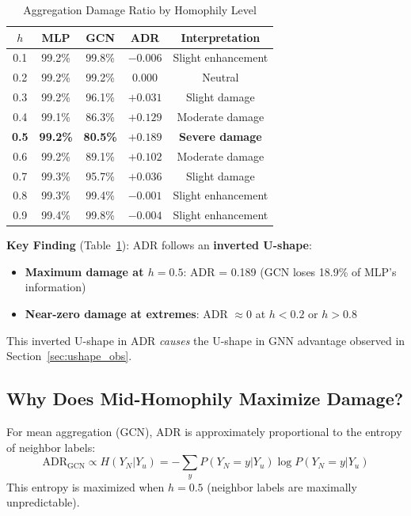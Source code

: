 \begin{table}[t]
\centering
\caption{Aggregation Damage Ratio by Homophily Level}
\label{tab:adr_by_h}
\begin{tabular}{@{}ccccc@{}}
\toprule
\textbf{$h$} & \textbf{MLP} & \textbf{GCN} & \textbf{ADR} & \textbf{Interpretation} \\
\midrule
0.1 & 99.2\% & 99.8\% & $-0.006$ & Slight enhancement \\
0.2 & 99.2\% & 99.2\% & $0.000$ & Neutral \\
0.3 & 99.2\% & 96.1\% & $+0.031$ & Slight damage \\
0.4 & 99.1\% & 86.3\% & $+0.129$ & Moderate damage \\
\textbf{0.5} & \textbf{99.2\%} & \textbf{80.5\%} & $\mathbf{+0.189}$ & \textbf{Severe damage} \\
0.6 & 99.2\% & 89.1\% & $+0.102$ & Moderate damage \\
0.7 & 99.3\% & 95.7\% & $+0.036$ & Slight damage \\
0.8 & 99.3\% & 99.4\% & $-0.001$ & Slight enhancement \\
0.9 & 99.4\% & 99.8\% & $-0.004$ & Slight enhancement \\
\bottomrule
\end{tabular}
\end{table}

\textbf{Key Finding} (Table~\ref{tab:adr_by_h}): ADR follows an \textbf{inverted U-shape}:
\begin{itemize}
    \item \textbf{Maximum damage at $h = 0.5$}: ADR = 0.189 (GCN loses 18.9\% of MLP's information)
    \item \textbf{Near-zero damage at extremes}: ADR $\approx 0$ at $h < 0.2$ or $h > 0.8$
\end{itemize}

This inverted U-shape in ADR \textit{causes} the U-shape in GNN advantage observed in Section~\ref{sec:ushape_obs}.

\subsection{Why Does Mid-Homophily Maximize Damage?}

\begin{proposition}
\label{prop:adr_entropy}
For mean aggregation (GCN), ADR is approximately proportional to the entropy of neighbor labels:
\begin{equation}
    \text{ADR}_{\text{GCN}} \propto H(Y_N | Y_u) = -\sum_{y} P(Y_N = y | Y_u) \log P(Y_N = y | Y_u)
\end{equation}
This entropy is maximized when $h = 0.5$ (neighbor labels are maximally unpredictable).
\end{proposition}

